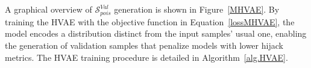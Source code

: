 A graphical overview of $\mathcal{S}^{Val}_{pois}$ generation is shown in Figure~\ref{MHVAE}.
By training the HVAE with the objective function in Equation~\ref{lossMHVAE}, the model encodes a distribution distinct from the input samples’ usual one, enabling the generation of validation samples that penalize models with lower hijack metrics.
The HVAE training procedure is detailed in Algorithm~\ref{alg.HVAE}.

%     

\begin{figure*}[!htbp] %
    \footnotesize
    \centering
    
    \caption{Schematic representation of the generation process of $\mathcal{S}^{Val}_{pois}$. For simplicity, we reported samples from the MNIST dataset~\cite{lecun2010mnist}.}
    \label{MHVAE}
\end{figure*}


